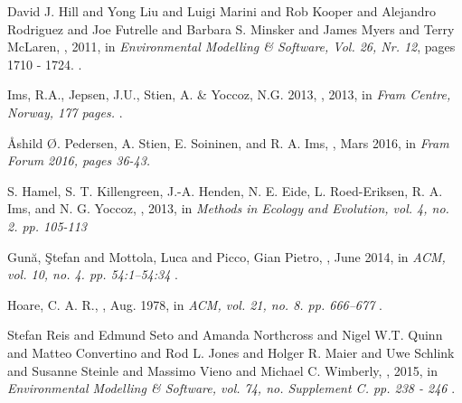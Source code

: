\documentclass[USenglish]{uit-thesis}
\begin{document}
\begin{thebibliography}{9}
David J. Hill and Yong Liu and Luigi Marini and Rob Kooper and Alejandro Rodriguez and Joe Futrelle and Barbara S. Minsker and James Myers and Terry McLaren,
, 2011,
\newblock in {\em  Environmental Modelling \& Software, Vol. 26, Nr. 12}, pages 1710 - 1724.
.

Ims, R.A., Jepsen, J.U., Stien, A. \& Yoccoz, N.G. 2013,
, 2013,
\newblock in {\em  Fram Centre, Norway, 177 pages.}
.

Åshild Ø. Pedersen, A. Stien, E. Soininen, and R. A. Ims,
, Mars 2016,
\newblock in {\em  Fram Forum 2016, pages 36-43.}

S. Hamel, S. T. Killengreen, J.-A. Henden, N. E. Eide, L. Roed-Eriksen, R. A. Ims, and N. G. Yoccoz,
, 2013,
\newblock in {\em Methods in Ecology and Evolution, vol. 4, no. 2. pp. 105-113}

Gun\u{a}, \c{S}tefan and Mottola, Luca and Picco, Gian Pietro,
, June 2014,
\newblock in {\em ACM, vol. 10, no. 4. pp. 54:1--54:34}
.

Hoare, C. A. R.,
, Aug. 1978,
\newblock in {\em ACM, vol. 21, no. 8. pp. 666--677}
.

Stefan Reis and Edmund Seto and Amanda Northcross and Nigel W.T. Quinn and Matteo Convertino and Rod L. Jones and Holger R. Maier and Uwe Schlink and Susanne Steinle and Massimo Vieno and Michael C. Wimberly,
, 2015,
\newblock in {\em Environmental Modelling \& Software, vol. 74, no. Supplement C. pp. 238 - 246}
.

\end{thebibliography}
\end{document}
